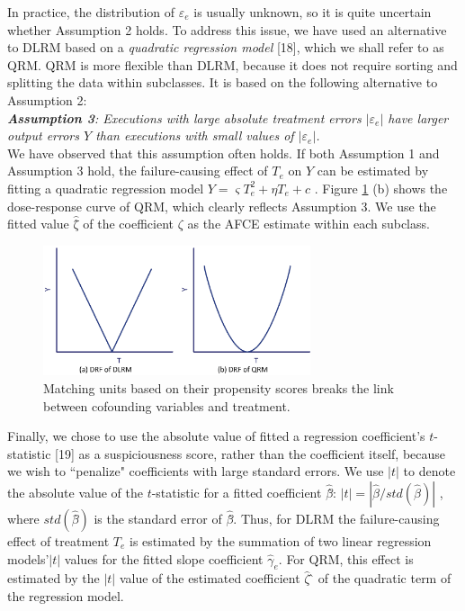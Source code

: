 \documentclass[times]{stvrauth}
\begin{document}
In practice, the distribution of $\varepsilon_e$  is usually unknown, so it is quite uncertain whether Assumption 2 holds.  To address this issue, we have used an alternative to DLRM based on a {\it quadratic regression model} [18], which we shall refer to as QRM.   QRM is more flexible than DLRM, because it does not require sorting and splitting the data within subclasses.  It is based on the following alternative to Assumption 2:\\
\newline
\textit{ \textbf{ Assumption 3}: Executions with large absolute treatment errors $\left| {{\varepsilon _e}} \right|$ have larger output errors $Y$ than executions with small values of $\left| {{\varepsilon _e}} \right|$.}\\
\newline
We have observed that this assumption often holds.  If both Assumption 1 and Assumption 3 hold, the failure-causing effect of $T_e$ on $Y$ can be estimated by fitting a quadratic regression model $Y = \varsigma T_e^2 + \eta {T_e} + c$  . Figure \ref{DRF_curves} (b) shows the dose-response curve of QRM, which clearly reflects Assumption 3.  We use the fitted value $\hat \zeta $̂ of the coefficient $ \zeta $ as the AFCE estimate within each subclass.
\vspace{-0.1cm}

\begin{figure}[!thpb]
\centering
\includegraphics[width=0.7\textwidth]{DRF_curves.eps}
\caption{Matching units based on their propensity scores breaks the link between cofounding variables and treatment.}
\label{DRF_curves}
\end{figure}
\vspace{-0.1cm}

Finally, we chose to use the absolute value of fitted a regression coefficient's $t$-statistic [19] as a suspiciousness score, rather than the coefficient itself, because we wish to ``penalize" coefficients with large standard errors.  We use $\left| t \right|$ to denote the absolute value of the $t$-statistic for a fitted coefficient $\hat \beta $̂: $\left| t \right| = |\hat \beta /std ( {\hat \beta })|$ , where $std(\hat \beta ̂)$ is the standard error of $\hat \beta$̂.  Thus, for DLRM the failure-causing effect of treatment $T_e$ is estimated by the summation of two linear regression models'$\left| t \right|$ values for the fitted slope coefficient ${{\hat \gamma }_e}$.  For QRM, this effect is estimated by the $\left| t \right|$ value of the estimated coefficient ${\hat \zeta }$ ̂ of the quadratic term of the regression model.
\end{document}
